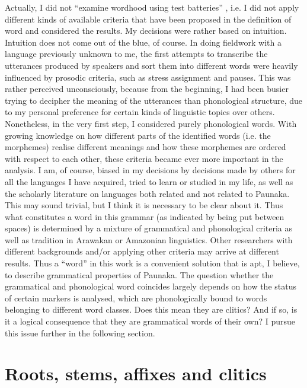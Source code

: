 Actually, I did not “examine wordhood using test batteries” \citep[60]{Haspelmath2011}, i.e. I did not apply different kinds of available criteria that have been proposed in the definition of word and considered the results. My decisions were rather based on intuition. Intuition does not come out of the blue, of course. In doing fieldwork with a language previously unknown to me, the first attempts to transcribe the utterances produced by speakers and sort them into different words were heavily influenced by prosodic criteria, such as stress assignment and pauses. This was rather perceived unconsciously, because from the beginning, I had been busier trying to decipher the meaning of the utterances than phonological structure, due to my personal preference for certain kinds of linguistic topics over others. Nonetheless, in the very first step, I considered purely phonological words. With growing knowledge on how different parts of the identified words (i.e. the morphemes) realise different meanings and how these morphemes are ordered with respect to each other, these criteria became ever more important in the analysis. I am, of course, biased in my decisions by decisions made by others for all the languages I have acquired, tried to learn or studied in my life, as well as the scholarly literature on languages both related and not related to Paunaka. This may sound trivial, but I think it is necessary to be clear about it. Thus what constitutes a word in this grammar (as indicated by being put between spaces) is determined by a mixture of grammatical and phonological criteria as well as tradition in Arawakan or Amazonian linguistics. Other researchers with different backgrounds and/or applying other criteria may arrive at different results. Thus a “word” in this work is a convenient solution that is apt, I believe, to describe grammatical properties of Paunaka. The question whether the grammatical and phonological word coincides largely depends on how the status of certain markers is analysed, which are phonologically bound to words belonging to different word classes. Does this mean they are clitics? And if so, is it a logical consequence that they are grammatical words of their own? I pursue this issue further in the following section.


\section{Roots, stems, affixes and clitics}\label{sec:AffixesAndClitics}

